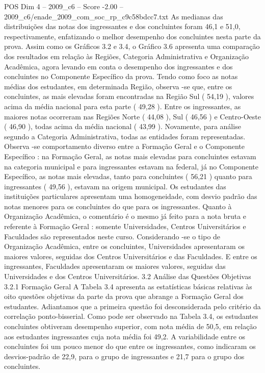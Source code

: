 \begin{textsample}{POS Dim 4 – 2009\_c6 – Score -2.00 – 2009\_c6/enade\_2009\_com\_soc\_rp\_c9c58bdcc7.txt}
As medianas das distribuições das notas dos ingressantes e dos concluintes foram 46,1 e 51,0, respectivamente, enfatizando o melhor desempenho dos concluintes nesta parte da prova.
Assim como os Gráficos 3.2 e 3.4, o Gráfico 3.6 apresenta uma comparação dos resultados em relação às Regiões, Categoria Administrativa e Organização Acadêmica, agora levando em conta o desempenho dos ingressantes e dos concluintes no Componente Específico da prova.
Tendo como foco as notas médias dos estudantes, em determinada Região, observa -se que, entre os concluintes, as mais elevadas foram encontradas na Região Sul ( 54,19 ), valores acima da média nacional para esta parte ( 49,28 ).
Entre os ingressantes, as maiores notas ocorreram nas Regiões Norte ( 44,08 ), Sul ( 46,56 ) e Centro-Oeste ( 46,90 ), todas acima da média nacional ( 43,99 ).
Novamente, para análise segundo a Categoria Administrativa, todas as entidades foram representadas.
Observa -se comportamento diverso entre a Formação Geral e o Componente Específico : na Formação Geral, as notas mais elevadas para concluintes estavam na categoria municipal e para ingressantes estavam na federal, já no Componente Específico, as notas mais elevadas, tanto para concluintes ( 56,21 ) quanto para ingressantes ( 49,56 ), estavam na origem municipal.
Os estudantes das instituições particulares apresentam uma homogeneidade, com desvio padrão das notas menores para os concluintes do que para os ingressantes.
Quanto à Organização Acadêmica, o comentário é o mesmo já feito para a nota bruta e referente à Formação Geral : somente Universidades, Centros Universitários e Faculdades são representados neste curso.
Considerando -se o tipo de Organização Acadêmica, entre os concluintes, Universidades apresentaram os maiores valores, seguidas dos Centros Universitários e das Faculdades.
E entre os ingressantes, Faculdades apresentaram os maiores valores, seguidas das Universidades e dos Centros Universitários. 3.2 Análise das Questões Objetivas 3.2.1 Formação Geral A Tabela 3.4 apresenta as estatísticas básicas relativas às oito questões objetivas da parte da prova que abrange a Formação Geral dos estudantes.
Adiantamos que a primeira questão foi desconsiderada pelo critério da correlação ponto-bisserial.
Como pode ser observado na Tabela 3.4, os estudantes concluintes obtiveram desempenho superior, com nota média de 50,5, em relação aos estudantes ingressantes cuja nota média foi 49,2.
A variabilidade entre os concluintes foi um pouco menor do que entre os ingressantes, como indicaram os desvios-padrão de 22,9, para o grupo de ingressantes e 21,7 para o grupo dos concluintes.

\end{textsample}
